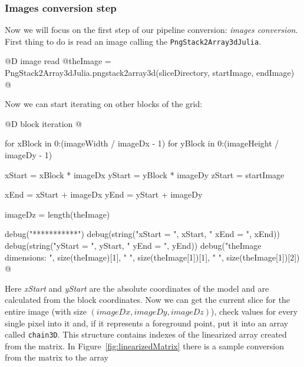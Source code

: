\documentclass[11pt,oneside]{article}	%
\begin{document}
\subsubsection{Images conversion step}\label{sec:conversionProcess}

Now we will focus on the first step of our pipeline conversion: \textit{images conversion}.\\
First thing to do is read an image calling the \texttt{PngStack2Array3dJulia}.

@D image read
@{theImage = PngStack2Array3dJulia.pngstack2array3d(sliceDirectory,
						startImage, endImage)
@}

Now we can start iterating on other blocks of the grid:

@D block iteration
@{for xBlock in 0:(imageWidth / imageDx - 1)
  for yBlock in 0:(imageHeight / imageDy - 1)
  
    xStart = xBlock * imageDx
    yStart = yBlock * imageDy
    zStart = startImage
    
    xEnd = xStart + imageDx
    yEnd = yStart + imageDy
  
    imageDz = length(theImage)
  
    debug("***********")
    debug(string("xStart = ", xStart, " xEnd = ", xEnd))
    debug(string("yStart = ", yStart, " yEnd = ", yEnd))
    debug("theImage dimensions: ", size(theImage)[1], " ",
	  size(theImage[1])[1], " ", size(theImage[1])[2]) @}

Here \textit{xStart} and \textit{yStart} are the absolute coordinates of the model and are calculated from the block coordinates. Now we can get the current slice for the entire image (with size $(imageDx, imageDy, imageDz)$), check values for every single pixel into it and, if it represents a foreground point, put it into an array called \texttt{chain3D}. This structure contains indexes of the linearized array created from the matrix. In Figure~\ref{fig:linearizedMatrix} there is a sample conversion from the matrix to the array
\end{document}
